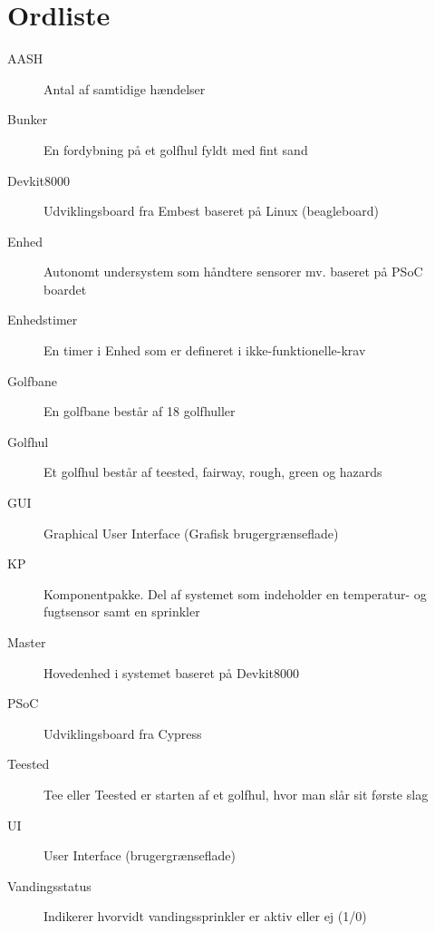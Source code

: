 \chapter{Ordliste}


\begin{description}

\item[AASH] Antal af samtidige hændelser
\item[Bunker] En fordybning på et golfhul fyldt med fint sand
\item[Devkit8000] Udviklingsboard fra Embest baseret på Linux (beagleboard)
\item[Enhed] Autonomt undersystem som håndtere sensorer mv. baseret på PSoC boardet
\item[Enhedstimer] En timer i Enhed som er defineret i ikke-funktionelle-krav
\item[Golfbane] En golfbane består af 18 golfhuller
\item[Golfhul] Et golfhul består af teested, fairway, rough, green og hazards
\item[GUI] Graphical User Interface (Grafisk brugergrænseflade)
\item[KP] Komponentpakke. Del af systemet som indeholder en temperatur- og fugtsensor samt en sprinkler
\item[Master] Hovedenhed i systemet baseret på Devkit8000
\item[PSoC] Udviklingsboard fra Cypress
\item[Teested] Tee eller Teested er starten af et golfhul, hvor man slår sit første slag
\item[UI] User Interface (brugergrænseflade)
\item[Vandingsstatus] Indikerer hvorvidt vandingssprinkler er aktiv eller ej (1/0)


\end{description}